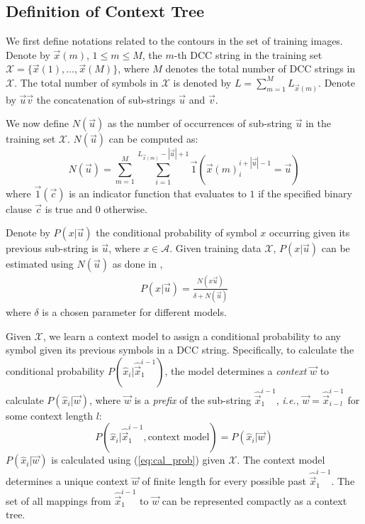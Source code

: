 \subsection{Definition of Context Tree}
\label{subsec:contextTree}

We first define notations related to the contours in the set of training images.
Denote by $\vec{x}(m)$, $1 \leq m \leq M$, the $m$-th DCC string in the training set $\mathcal{X} = \{\vec{x}(1),\ldots,\vec{x}(M)\}$, where $M$ denotes the total number of DCC strings in $\mathcal{X}$. The total number of symbols in $\mathcal{X}$ is denoted by $L = \sum^{M}_{m=1}L_{\vec{x}(m)}$. 
Denote by $\vec{u}\vec{v}$ the concatenation of sub-strings $\vec{u}$ and $\vec{v}$.

We now define $N(\vec{u})$ as the number of occurrences of sub-string $\vec{u}$ in the training set $\mathcal{X}$. $N(\vec{u})$ can be computed as:
\begin{equation}
N(\vec{u})=\sum^{M}_{m=1}\sum_{i=1}^{L_{\vec{x}(m)} - |\vec{u}| + 1}
\vec{1} \left(
\vec{x}(m)_i^{i+|\vec{u}|-1} = \vec{u}
\right) 
\end{equation}
where $\vec{1}(\vec{c})$ is an indicator function that evaluates to $1$ if the specified binary clause $\vec{c}$ is true and $0$ otherwise.

Denote by $P(x|\vec{u})$ the conditional probability of symbol $x$ occurring given its previous sub-string is $\vec{u}$, where $x\in\mathcal{A}$. Given training data $\mathcal{X}$, $P(x|\vec{u})$ can be estimated using $N(\vec{u})$ as done in \cite{buhlmann1999variable},
\begin{equation}
\begin{array}{cc}
P(x|\vec{u})=\frac{N(x\vec{u})}{\delta +  N(\vec{u})}
\end{array}
\label{eq:cal_prob}
\end{equation}
where $\delta$ is a chosen parameter for different models.

Given $\mathcal{X}$, we learn a context model to assign a conditional probability to any symbol given its previous symbols in a DCC string. Specifically, to calculate the conditional probability $P(\hat{x}_i|\hat{\vec{x}}^{i-1}_{1})$, the model determines a \textit{context} $\vec{w}$ to calculate $P(\hat{x}_i|\vec{w})$, where $\vec{w}$ is a \textit{prefix} of the sub-string $\hat{\vec{x}}^{i-1}_{1}$, \textit{i.e.}, $\vec{w} = \hat{\vec{x}}^{i-1}_{i-l}$ for some context length $l$:
\begin{equation}
P(\hat{x}_i|\hat{\vec{x}}^{i-1}_{1}, \text{context model})=P(\hat{x}_i|\vec{w})
\label{eq:conditionalProbContextModel}
\end{equation}
$P(\hat{x}_i|\vec{w})$ is calculated using (\ref{eq:cal_prob}) given $\mathcal{X}$. 
The context model determines a unique context $\vec{w}$ of finite length for every possible past $\hat{\vec{x}}^{i-1}_{1}$. The set of all mappings from $\hat{\vec{x}}^{i-1}_{1}$ to $\vec{w}$ can be represented compactly as a context tree.

